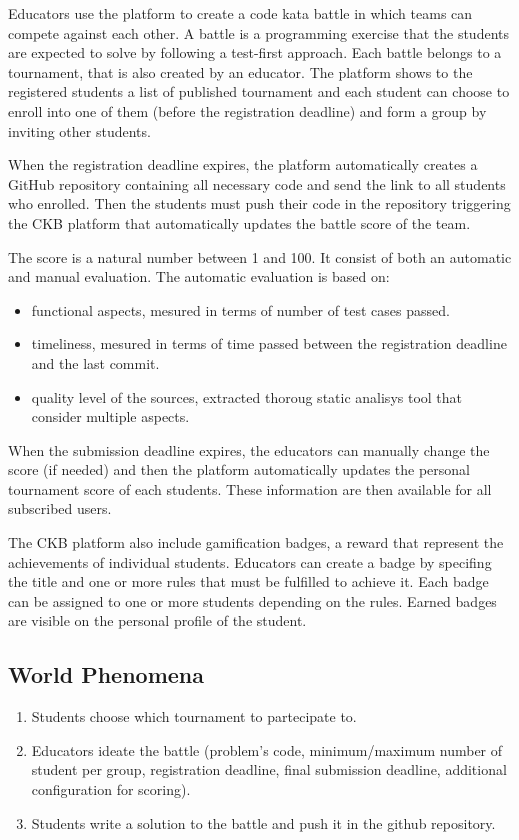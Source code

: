 \null
Educators use the platform to create a code kata battle in which teams can compete against each other. A battle is a programming exercise that the students are expected to solve by following a test-first approach. Each battle belongs to a tournament, that is also created by an educator.
The platform shows to the registered students a list of published tournament and each student can choose to enroll into one of them (before the registration deadline) and form a group by inviting other students.

When the registration deadline expires, the platform automatically creates a GitHub repository containing all necessary code and send the link to all students who enrolled. 
Then the students must push their code in the repository triggering the CKB platform that automatically updates the battle score of the team.



\null
The score is a natural number between 1 and 100. It consist of both an automatic and manual evaluation.  
The automatic evaluation is based on:

\begin{itemize}
    \item functional aspects, mesured in terms of number of test cases passed.
    \item timeliness, mesured in terms of time passed between the registration deadline and the last commit.
    \item quality level of the sources, extracted thoroug static analisys tool that consider multiple aspects.
\end{itemize}

When the submission deadline expires, the educators can manually change the score (if needed) and then the platform automatically updates the personal tournament score of each students. These information are then available for all subscribed users.

\null
The CKB platform also include gamification badges, a reward that represent the achievements of individual students. Educators can create a badge by specifing the title and one or more rules that must be fulfilled to achieve it. Each badge can be assigned to one or more students depending on the rules. Earned badges are visible on the personal profile of the student.



\subsection{World Phenomena}
\begin{enumerate}[label=\textbf{WP.\arabic*}]
	\item Students choose which tournament to partecipate to.
	\item Educators ideate the battle (problem's code, minimum/maximum number of student per group, registration deadline, final submission deadline, additional configuration for scoring).
        \item Students write a solution to the battle and push it in the github repository.
\end{enumerate}

